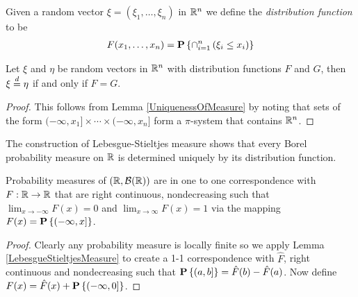 \begin{defn}Given a random vector $\xi = (\xi_1, \dots, \xi_n)$ in
  $\mathbb{R}^n$ we define the \emph{distribution function} to be 
\begin{align*}
F(x_1, \dots, x_n) = \textbf{P}\left \{\cap_{i=1}^n \left ( \xi_i \leq x_i
    \right )  \right \}
\end{align*}
\end{defn}
\begin{lem}\label{DistributionFunctionCharacterizeProbability}Let $\xi$ and $\eta$ be random vectors in $\mathbb{R}^n$ with
  distribution functions $F$ and $G$, then
  $\xi \overset{d}= \eta$ if and only if $F = G$.
\end{lem}
\begin{proof}This follows from Lemma \ref{UniquenessOfMeasure} by
  noting
  that sets of the form $(-\infty, x_1] \times \cdots \times (-\infty,
  x_n]$ form a $\pi$-system that contains $\mathbb{R}^n$.
\end{proof}

The construction of Lebesgue-Stieltjes measure shows that every
Borel probability measure on $\mathbb{R}$ is determined uniquely by its distribution function.
\begin{lem}Probability measures of $(\mathbb{R}, \mathcal{B}(\mathbb{R}))$ are
  in one to one correspondence with $F : \mathbb{R} \to \mathbb{R}$ that are
  right continuous, nondecreasing such that $\lim_{x \to -\infty} F(x)
  = 0$ and $\lim_{x \to \infty} F(x) = 1$ via the mapping $F(x) =
  \textbf{P}\left \{(-\infty, x] \right \}$.
\end{lem}
\begin{proof}Clearly any probability measure is locally finite so we
  apply Lemma \ref{LebesgueStieltjesMeasure} to create a 1-1
  correspondence with $\hat{F}$, 
  right continuous and nondecreasing such that $\textbf{P}\left \{(a,b] \right \} =
  \hat{F}(b) - \hat{F}(a)$.  Now define $F(x) = \hat{F}(x) +
  \textbf{P}\left \{(-\infty, 0] \right \}$.
\end{proof}

